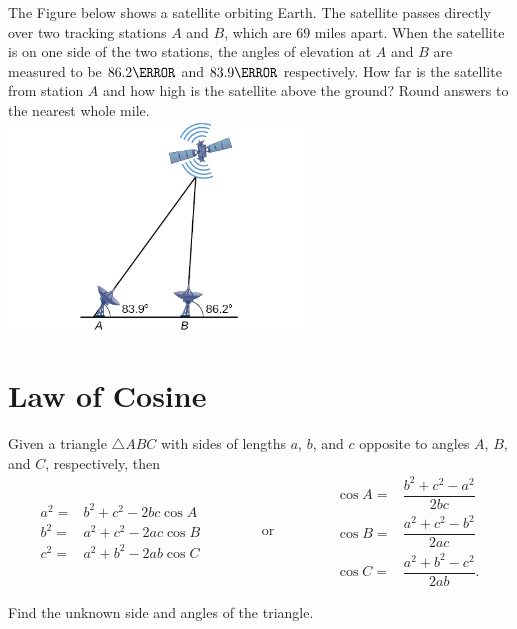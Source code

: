 \newpage

\begin{exercise}
  The Figure below shows a satellite orbiting Earth. The satellite passes directly over two tracking stations  $A$ and $B$, which are $69$ miles apart. When the satellite is on one side of the two stations, the angles of elevation at $A$ and $B$ are measured to be $86.2\degree$ and  $83.9\degree$ respectively. How far is the satellite from station  $A$ and how high is the satellite above the ground? Round answers to the nearest whole mile.\\
  \includegraphics[width=0.6\textwidth]{figs/CNX_Precalc_Figure_08_01_233.jpg}
\end{exercise}

\newpage

\section{Law of Cosine}
\begin{theorem}
  Given a triangle $\triangle ABC$ with sides of lengths $a$, $b$, and $c$ opposite to angles $A$, $B$, and $C$, respectively, then
\[
\begin{aligned}
  a^2=&b^2+c^2-2bc\cos A\\
  b^2=&a^2+c^2-2ac\cos B\\
  c^2=&a^2+b^2-2ab\cos C
\end{aligned}
\qquad\qquad \text{or}\qquad\qquad
\begin{aligned}
  \cos A =&\dfrac{b^2+c^2-a^2}{2bc}\\
  \cos B =&\dfrac{a^2+c^2-b^2}{2ac}\\
  \cos C=&\dfrac{a^2+b^2-c^2}{2ab}.
\end{aligned}
\]
\end{theorem}

\begin{example}
  Find the unknown side and angles of the triangle.\\
\end{example}


